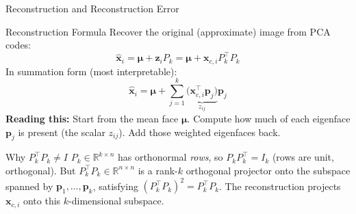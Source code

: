 \documentclass{beamer}
\begin{document}
\begin{frame}[shrink=10]{Reconstruction and Reconstruction Error}
  \begin{block}{Reconstruction Formula}
    Recover the original (approximate) image from PCA codes:
    \[
      \hat{\mathbf{x}}_i
        = \boldsymbol{\mu} + \mathbf{z}_i P_k
        = \boldsymbol{\mu} + \mathbf{x}_{c,i} P_k^\top P_k
    \]
    In summation form (most interpretable):
    \[
      \boxed{
        \hat{\mathbf{x}}_i
          = \boldsymbol{\mu}
            + \sum_{j=1}^{k}
              \underbrace{\bigl(\mathbf{x}_{c,i}^\top\mathbf{p}_j\bigr)}_{z_{ij}}
              \mathbf{p}_j
      }
    \]
    \textbf{Reading this:}
    Start from the mean face $\boldsymbol{\mu}$.
    Compute how much of each eigenface $\mathbf{p}_j$ is present
    (the scalar $z_{ij}$).
    Add those weighted eigenfaces back.
  \end{block}

  \begin{block}{Why $P_k^\top P_k \neq I$}
    $P_k \in \mathbb{R}^{k \times n}$ has orthonormal \emph{rows},
    so $P_k P_k^\top = I_k$ (rows are unit, orthogonal).
    But $P_k^\top P_k \in \mathbb{R}^{n \times n}$ is a rank-$k$
    orthogonal projector onto the subspace spanned by
    $\mathbf{p}_1,\ldots,\mathbf{p}_k$, satisfying
    $(P_k^\top P_k)^2 = P_k^\top P_k$.
    The reconstruction projects $\mathbf{x}_{c,i}$ onto this
    $k$-dimensional subspace.
  \end{block}
\end{frame}
\end{document}
